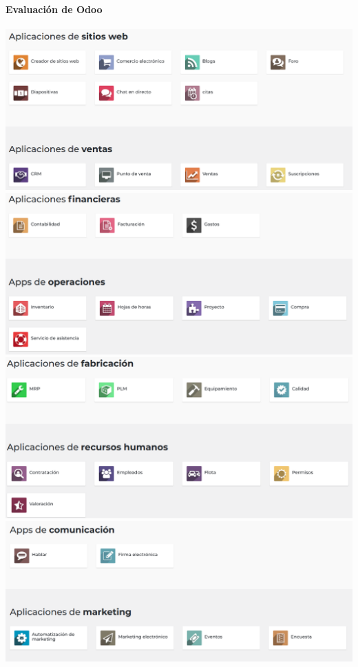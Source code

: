 \documentclass{article}
\begin{document}
\paragraph{Evaluación de Odoo}

\begin{flushleft}
	\includegraphics[scale=0.25]{imagenes/Odoo1.png} 
	\includegraphics[scale=0.25]{imagenes/Odoo2.png}
	\includegraphics[scale=0.25]{imagenes/Odoo3.png}
	\includegraphics[scale=0.25]{imagenes/Odoo4.png}

\end{flushleft}
\end{document}

